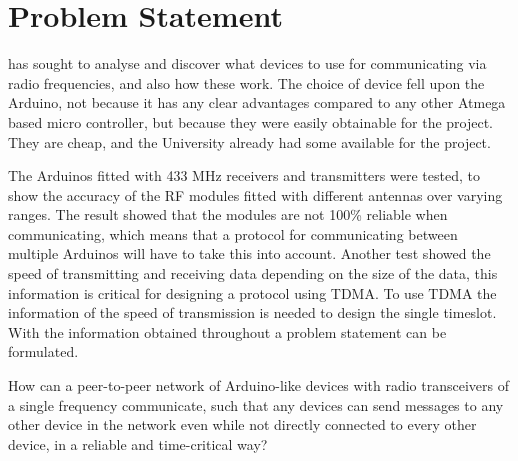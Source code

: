 \newpage
\section{Problem Statement}\label{sec:problemStatement}

 has sought to analyse and discover what devices to use for communicating via radio frequencies, and also how these work.
The choice of device fell upon the Arduino, not because it has any clear advantages compared to any other Atmega based micro controller, but because they were easily obtainable for the project.
They are cheap, and the University already had some available for the project.

The Arduinos fitted with 433 MHz receivers and transmitters were tested, to show the accuracy of the RF modules fitted with different antennas over varying ranges. 
The result showed that the modules are not 100\% reliable when communicating, which means that a protocol for communicating between multiple Arduinos will have to take this into account.
Another test showed the speed of transmitting and receiving data depending on the size of the data, this information is critical for designing a protocol using TDMA.
To use TDMA the information of the speed of transmission is needed to design the single timeslot. 
With the information obtained throughout  a problem statement can be formulated.

\bigskip

{\addtolength{\leftskip}{10mm}\addtolength{\rightskip}{10mm}\noindent\hrulefill\it

\noindent How can a peer-to-peer network of Arduino-like devices with radio transceivers of a single frequency communicate, such that any devices can send messages to any other device in the network even while not directly connected to every other device, in a reliable and time-critical way? 

\noindent\hrulefill

}

\bigskip








